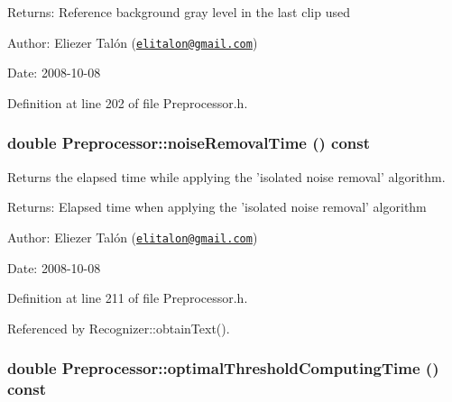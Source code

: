 \begin{Desc}
\item[Returns:]Reference background gray level in the last clip used\end{Desc}
\begin{Desc}
\item[Author:]Eliezer Talón (\href{mailto:elitalon@gmail.com}{\tt elitalon@gmail.com}) \end{Desc}
\begin{Desc}
\item[Date:]2008-10-08 \end{Desc}


Definition at line 202 of file Preprocessor.h.\hypertarget{class_preprocessor_0cccd23820430541f18f2b24dbfd0784}{
\subsubsection[noiseRemovalTime]{\setlength{\rightskip}{0pt plus 5cm}double Preprocessor::noiseRemovalTime () const}}
\label{class_preprocessor_0cccd23820430541f18f2b24dbfd0784}


Returns the elapsed time while applying the 'isolated noise removal' algorithm. 

\begin{Desc}
\item[Returns:]Elapsed time when applying the 'isolated noise removal' algorithm\end{Desc}
\begin{Desc}
\item[Author:]Eliezer Talón (\href{mailto:elitalon@gmail.com}{\tt elitalon@gmail.com}) \end{Desc}
\begin{Desc}
\item[Date:]2008-10-08 \end{Desc}


Definition at line 211 of file Preprocessor.h.

Referenced by Recognizer::obtainText().\hypertarget{class_preprocessor_72dd29238c4202698e67dcb26a47f4b5}{
\subsubsection[optimalThresholdComputingTime]{\setlength{\rightskip}{0pt plus 5cm}double Preprocessor::optimalThresholdComputingTime () const}}
\label{class_preprocessor_72dd29238c4202698e67dcb26a47f4b5}


